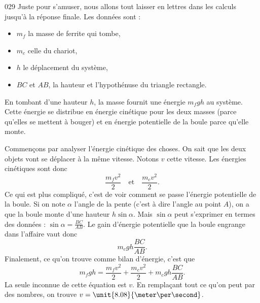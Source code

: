 \documentclass{article}
\begin{document}
\begin{corrige}{029}
Juste pour s'amuser, nous allons tout laisser en lettres dans les calculs jusqu'à la réponse finale. Les données sont :

\begin{itemize}
\item $m_f$ la masse de ferrite qui tombe,
\item $m_c$ celle du chariot,
\item $h$ le déplacement du système,
\item $BC$ et $AB$, la hauteur et l'hypothénuse du triangle rectangle.
\end{itemize}

En tombant d'une hauteur $h$, la masse fournit une énergie $m_fgh$ au système. Cette énergie se distribue en énergie cinétique pour les deux masses (parce qu'elles se mettent à bouger) et en énergie potentielle de la boule parce qu'elle monte. 

Commençons par analyser l'énergie cinétique des choses. On sait que les deux objets vont se déplacer à la même vitesse. Notons $v$ cette vitesse. Les énergies cinétiques sont donc
\[ 
  \frac{ m_fv^2 }{ 2 }\quad\text{et}\quad\frac{ m_cv^2 }{ 2 }.
\]
Ce qui est plus compliqué, c'est de voir comment se passe l'énergie potentielle de la boule. Si on note $\alpha$ l'angle de la pente (c'est à dire l'angle au point $A$), on a que la boule monte d'une hauteur $h\sin\alpha$. Mais $\sin\alpha$ peut s'exprimer en termes des données : $\sin\alpha=\frac{ BC }{ AB }$. Le gain d'énergie potentielle que la boule engrange dans l'affaire vaut donc
\[ 
  m_cgh\frac{ BC }{ AB }.
\]
Finalement, ce qu'on trouve comme bilan d'énergie, c'est que
\[ 
  m_fgh=\frac{ m_fv^2 }{ 2 }+\frac{ m_cv^2 }{ 2 }+m_cgh\frac{ BC }{ AB }.
\]
La seule inconnue de cette équation est $v$. En remplaçant tout ce qu'on peut par des nombres, on trouve $v=\unit{8.08}{\meter\per\second}$.
                   


\end{corrige}
\end{document}
